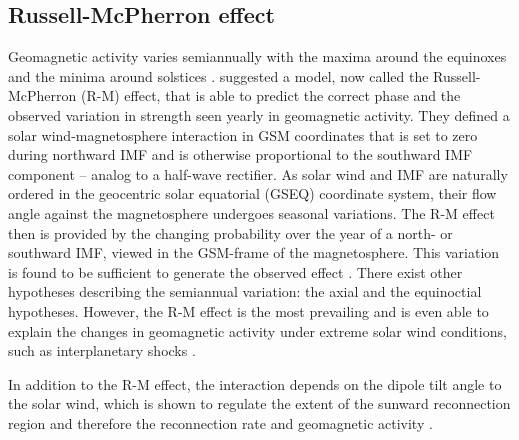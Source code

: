 \subsection{Russell-McPherron effect}
\label{sec:russell_mcpherron_effect}
Geomagnetic activity varies semiannually with the maxima around the equinoxes and the minima around solstices \citep{Cortie1912}. \citet{Russell1973} suggested a model, now called the Russell-McPherron (R-M) effect, that is able to predict the correct phase and the observed variation in strength seen yearly in geomagnetic activity. They defined a solar wind-magnetosphere interaction in GSM coordinates that is set to zero during northward IMF and is otherwise proportional to the southward IMF component -- analog to a half-wave rectifier. As solar wind and IMF are naturally ordered in the geocentric solar equatorial (GSEQ) coordinate system, their flow angle against the magnetosphere undergoes seasonal variations. The R-M effect then is provided by the changing probability over the year of a north- or southward IMF, viewed in the GSM-frame of the magnetosphere. This variation is found to be sufficient to generate the observed effect \citep{Russell1973}.
There exist other hypotheses describing the semiannual variation: the axial and the equinoctial hypotheses. However, the R-M effect is the most prevailing and is even able to explain the changes in geomagnetic activity under extreme solar wind conditions, such as interplanetary shocks \citep{Zhao2012}.

In addition to the R-M effect, the interaction depends on the dipole tilt angle to the solar wind, which is shown to regulate the extent of the sunward reconnection region and therefore the reconnection rate and geomagnetic activity \citep{Russell2003}.


